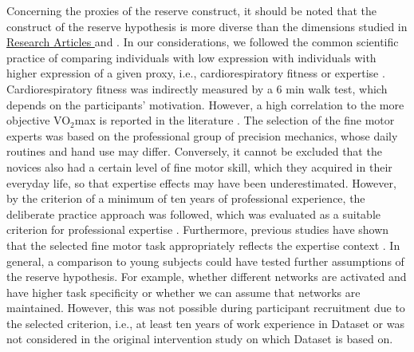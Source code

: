 Concerning the proxies of the reserve construct, it should be noted that the construct of the reserve hypothesis is more diverse than the dimensions studied in \hyperref[results:paperI]{Research Articles } and \hyperref[results:paperI]{}. In our considerations, we followed the common scientific practice of comparing individuals with low expression with individuals with higher expression of a given proxy, i.e., cardiorespiratory fitness or expertise \cite{Koen2019}. Cardiorespiratory fitness was indirectly measured by a 6 min walk test, which depends on the participants' motivation. However, a high correlation to the more objective VO$_2$max is reported in the literature \cite{Zhang2017}. The selection of the fine motor experts was based on the professional group of precision mechanics, whose daily routines and hand use may differ. Conversely, it cannot be excluded that the novices also had a certain level of fine motor skill, which they acquired in their everyday life, so that expertise effects may have been underestimated. However, by the criterion of a minimum of ten years of professional experience, the deliberate practice approach was followed, which was evaluated as a suitable criterion for professional expertise \cite{Ericsson1991, Voelcker-Rehage2013}. Furthermore, previous studies have shown that the selected fine motor task appropriately reflects the expertise context \cite{Vieluf2018, Goelz2018, Vieluf2012, Vieluf2013}. In general, a comparison to young subjects could have tested further assumptions of the reserve hypothesis. For example, whether different networks are activated and have higher task specificity or whether we can assume that networks are maintained. However, this was not possible during participant recruitment due to the selected criterion, i.e., at least ten years of work experience in Dataset  or was not considered in the original intervention study on which Dataset  is based on.\\
